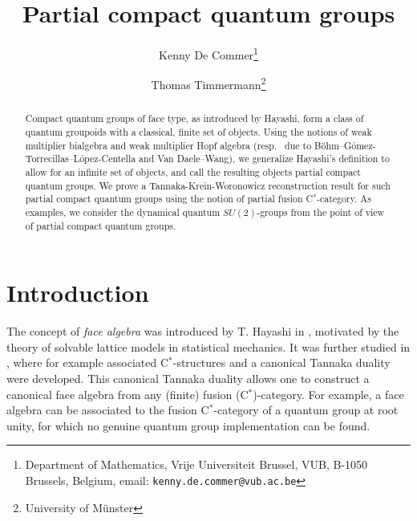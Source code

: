 \documentclass[10pt]{article}
\date{}
\theoremstyle{definition}
\numberwithin{equation}{section}
\begin{document}
\title{Partial compact quantum groups}

\author{Kenny De Commer\thanks{Department of Mathematics, Vrije Universiteit Brussel, VUB, B-1050 Brussels, Belgium, email: {\tt kenny.de.commer@vub.ac.be}}
\and Thomas Timmermann\thanks{University of M\"{u}nster}}

\maketitle

\begin{abstract}
\noindent Compact quantum groups of face type, as introduced by Hayashi, form a class of quantum groupoids with a classical, finite set of objects. Using the notions of weak multiplier bialgebra and weak multiplier Hopf algebra (resp.~ due to B{\"o}hm--G\'{o}mez-Torrecillas--L\'{o}pez-Centella and Van Daele--Wang), we generalize Hayashi's definition to allow for an infinite set of objects, and call the resulting objects partial compact quantum groups. We prove a Tannaka-Krein-Woronowicz reconstruction result for such partial compact quantum groups using the notion of partial fusion C$^*$-category. As examples, we consider the dynamical quantum $SU(2)$-groups from the point of view of partial compact quantum groups.
\end{abstract}







\tableofcontents

\section*{Introduction}

The concept of \emph{face algebra} was introduced by T. Hayashi in \cite{Hay2}, motivated by the theory of solvable lattice models in statistical mechanics. It was further studied in \cite{Hay1,Hay3,Hay4,Hay5,Hay6,Hay7,Hay8}, where for example associated C$^*$-structures and a canonical Tannaka duality were developed. This canonical Tannaka duality allows one to construct a canonical face algebra from any (finite) fusion (C$^*$)-category. For example, a face algebra can be associated to the fusion C$^*$-category of a quantum group at root unity, for which no genuine quantum group implementation can be found. 
\end{document}
